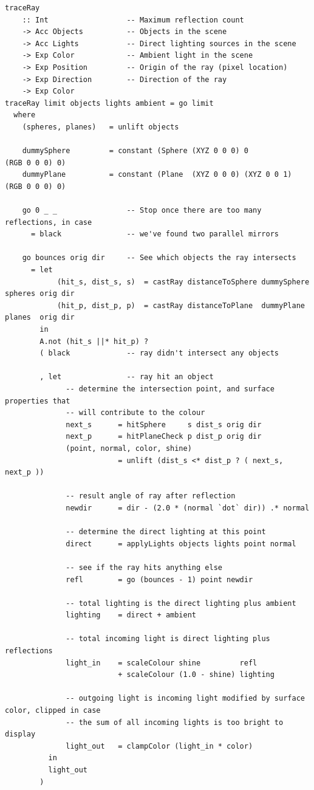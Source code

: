\begin{lstlisting}[style=haskell_float
    ,label=lst:ray
    ,caption={The core ray casting implementation}]
traceRay
    :: Int                  -- Maximum reflection count
    -> Acc Objects          -- Objects in the scene
    -> Acc Lights           -- Direct lighting sources in the scene
    -> Exp Color            -- Ambient light in the scene
    -> Exp Position         -- Origin of the ray (pixel location)
    -> Exp Direction        -- Direction of the ray
    -> Exp Color
traceRay limit objects lights ambient = go limit
  where
    (spheres, planes)   = unlift objects

    dummySphere         = constant (Sphere (XYZ 0 0 0) 0           (RGB 0 0 0) 0)
    dummyPlane          = constant (Plane  (XYZ 0 0 0) (XYZ 0 0 1) (RGB 0 0 0) 0)

    go 0 _ _                -- Stop once there are too many reflections, in case
      = black               -- we've found two parallel mirrors

    go bounces orig dir     -- See which objects the ray intersects
      = let
            (hit_s, dist_s, s)  = castRay distanceToSphere dummySphere spheres orig dir
            (hit_p, dist_p, p)  = castRay distanceToPlane  dummyPlane  planes  orig dir
        in
        A.not (hit_s ||* hit_p) ?
        ( black             -- ray didn't intersect any objects

        , let               -- ray hit an object
              -- determine the intersection point, and surface properties that
              -- will contribute to the colour
              next_s      = hitSphere     s dist_s orig dir
              next_p      = hitPlaneCheck p dist_p orig dir
              (point, normal, color, shine)
                          = unlift (dist_s <* dist_p ? ( next_s, next_p ))

              -- result angle of ray after reflection
              newdir      = dir - (2.0 * (normal `dot` dir)) .* normal

              -- determine the direct lighting at this point
              direct      = applyLights objects lights point normal

              -- see if the ray hits anything else
              refl        = go (bounces - 1) point newdir

              -- total lighting is the direct lighting plus ambient
              lighting    = direct + ambient

              -- total incoming light is direct lighting plus reflections
              light_in    = scaleColour shine         refl
                          + scaleColour (1.0 - shine) lighting

              -- outgoing light is incoming light modified by surface color, clipped in case
              -- the sum of all incoming lights is too bright to display
              light_out   = clampColor (light_in * color)
          in
          light_out
        )
\end{lstlisting}

